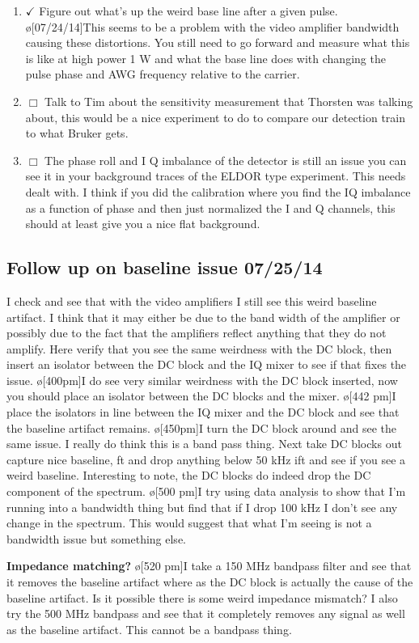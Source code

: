 \documentclass[10pt]{book}
\begin{document}
\begin{enumerate}
	\item $\checkmark$ Figure out what's up the weird base line after a given pulse. \o[07/24/14]{This seems to be a problem with the video amplifier bandwidth causing these distortions. You still need to go forward and measure what this is like at high power 1 W and what the base line does with changing the pulse phase and AWG frequency relative to the carrier.}
	\item $\Box$ Talk to Tim about the sensitivity measurement that Thorsten was talking about, this would be a nice experiment to do to compare our detection train to what Bruker gets.
	\item $\Box$ The phase roll and I Q imbalance of the detector is still an issue you can see it in your background traces of the ELDOR type experiment. This needs dealt with. I think if you did the calibration where you find the IQ imbalance as a function of phase and then just normalized the I and Q channels, this should at least give you a nice flat background.
\end{enumerate}
\subsection{Follow up on baseline issue 07/25/14}
I check and see that with the video amplifiers I still see this weird baseline artifact. I think that it may either be due to the band width of the amplifier or possibly due to the fact that the amplifiers reflect anything that they do not amplify. Here verify that you see the same weirdness with the DC block, then insert an isolator between the DC block and the IQ mixer to see if that fixes the issue. \o[400pm]{I do see very similar weirdness with the DC block inserted, now you should place an isolator between the DC blocks and the mixer.}
\o[442 pm]{I place the isolators in line between the IQ mixer and the DC block and see that the baseline artifact remains.}
\o[450pm]{I turn the DC block around and see the same issue. I really do think this is a band pass thing. Next take DC blocks out capture nice baseline, ft and drop anything below 50 kHz ift and see if you see a weird baseline. Interesting to note, the DC blocks do indeed drop the DC component of the spectrum.}
\o[500 pm]{I try using data analysis to show that I'm running into a bandwidth thing but find that if I drop 100 kHz I don't see any change in the spectrum. This would suggest that what I'm seeing is not a bandwidth issue but something else.}

{\bf Impedance matching?} 
\o[520 pm]{I take a 150 MHz bandpass filter and see that it removes the baseline artifact where as the DC block is actually the cause of the baseline artifact. Is it possible there is some weird impedance mismatch? I also try the 500 MHz bandpass and see that it completely removes any signal as well as the baseline artifact. This cannot be a bandpass thing.}
\end{document}
